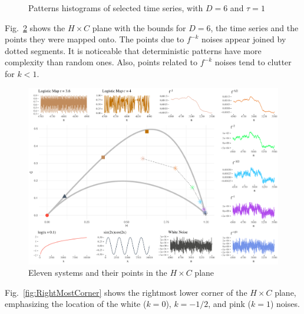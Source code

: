 \documentclass[sts]{imsart}
\begin{document}
\begin{figure}[hbt]
	\caption{Patterns histograms of selected time series, with $D=6$ and $\tau=1$\label{fig:Histograms}}
\end{figure}


Fig.~\ref{fig:AllSystems} shows the $H\times C$ plane with the bounds for $D=6$, the time series and the points they were mapped onto.
The points due to $f^{-k}$ noises appear joined by dotted segments.
It is noticeable that deterministic patterns have more complexity than random ones.
Also, points related to $f^{-k}$ noises tend to clutter for $k<1$.

\begin{figure}[hbt]
\centering
\includegraphics[width=\linewidth]{AllSystems}
\caption{Eleven systems and their points in the $H\times C$ plane}\label{fig:AllSystems}
\end{figure}

Fig.~\ref{fig:RightMostCorner} shows the rightmost lower corner of the $H\times C$ plane, emphasizing the location of the white ($k=0$), $k=-1/2$, and pink ($k=1$) noises.
\end{document}
